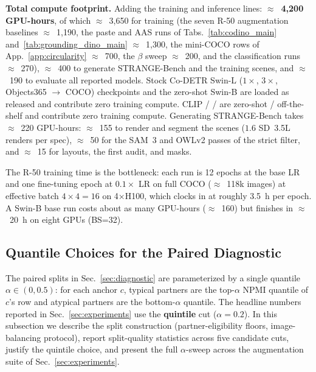 \noindent\textbf{Total compute footprint.}
Adding the training and inference lines:
\textbf{$\approx$~4{,}200 GPU-hours}, of which $\approx$~3{,}650 for training (the seven \codino{} R-50 augmentation baselines $\approx$~1{,}190, the paste and AAS runs of Tabs.~\ref{tab:codino_main} and~\ref{tab:grounding_dino_main} $\approx$~1{,}300, the mini-COCO rows of App.~\ref{app:circularity} $\approx$~700, the $\beta$ sweep $\approx$~200, and the classification runs $\approx$~270), $\approx$~400 to generate STRANGE-Bench and the training scenes, and $\approx$~190 to evaluate all reported models. Stock Co-DETR Swin-L ($1\times$,
$3\times$, Objects365 $\rightarrow$ COCO) checkpoints and the zero-shot \gdino{} Swin-B
are loaded as released and contribute zero training compute.
CLIP / \openclip{} / \llava{} are zero-shot / off-the-shelf and
contribute zero training compute.
Generating STRANGE-Bench takes $\approx$~220 GPU-hours: $\approx$~155 to render and segment the scenes ($1.6$ SD~3.5L renders per spec), $\approx$~50 for the SAM~3 and OWLv2 passes of the strict filter, and $\approx$~15 for layouts, the first audit, and masks.

The \codino{} R-50 training time is the bottleneck: each run is
12 epochs at the base LR and one fine-tuning epoch at $0.1\times$ LR on full COCO ($\approx$~118k images) at effective batch
$4{\times}4{=}16$ on 4$\times$H100, which clocks in at roughly
3.5~h per epoch.
A \gdino{} Swin-B base run costs about as many GPU-hours ($\approx$~160) but finishes in $\approx$~20~h on eight GPUs (BS=32).

\FloatBarrier
\subsection{Quantile Choices for the Paired Diagnostic}
\label{app:splits-impl}

The paired splits in Sec.~\ref{sec:diagnostic} are parameterized by a
single quantile $\alpha \in (0, 0.5)$: for each anchor $c$, typical
partners are the top-$\alpha$ NPMI quantile of $c$'s row and atypical
partners are the bottom-$\alpha$ quantile. The headline numbers
reported in Sec.~\ref{sec:experiments} use the \textbf{quintile} cut
($\alpha = 0.2$). In this subsection we describe the split
construction (partner-eligibility floors, image-balancing protocol),
report split-quality statistics across five candidate cuts, justify
the quintile choice, and present the full $\alpha$-sweep across the
augmentation suite of Sec.~\ref{sec:experiments}.

